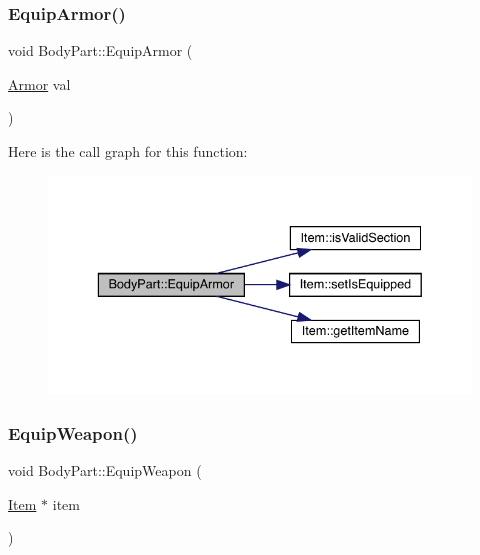 \subsubsection{\texorpdfstring{Equip\+Armor()}{EquipArmor()}\hspace{0.1cm}{\footnotesize\ttfamily [2/2]}}
{\footnotesize\ttfamily void Body\+Part\+::\+Equip\+Armor (\begin{DoxyParamCaption}\item[{\mbox{\hyperlink{class_armor}{Armor}}}]{val }\end{DoxyParamCaption})}

Here is the call graph for this function\+:
\nopagebreak
\begin{figure}[H]
\begin{center}
\leavevmode
\includegraphics[width=336pt]{d2/d6f/class_body_part_a651b65c40c95ecad5a8388736d6cc73a_cgraph}
\end{center}
\end{figure}
\mbox{\label{class_body_part_a6af5139c60c7b96bff6d8768c9ef8f22}} 
\subsubsection{\texorpdfstring{Equip\+Weapon()}{EquipWeapon()}}
{\footnotesize\ttfamily void Body\+Part\+::\+Equip\+Weapon (\begin{DoxyParamCaption}\item[{\mbox{\hyperlink{class_item}{Item}} $\ast$}]{item }\end{DoxyParamCaption})}

